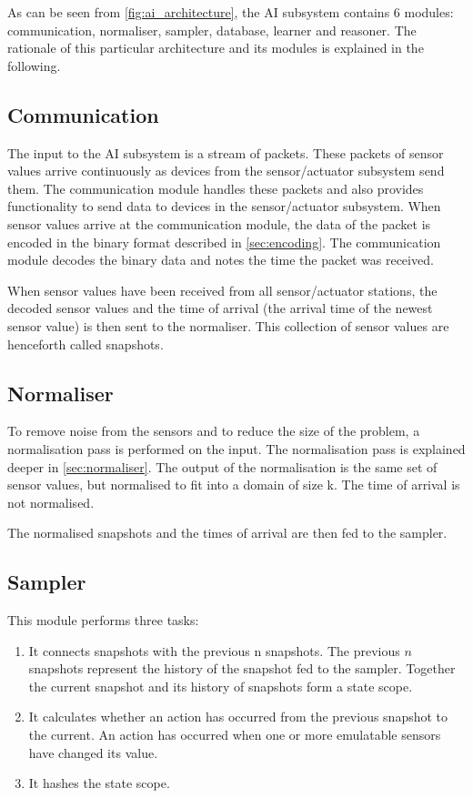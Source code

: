 As can be seen from \cref{fig:ai_architecture}, the AI subsystem contains 6 modules: communication, normaliser, sampler, database, learner and reasoner. The rationale of this particular architecture and its modules is explained in the following.

\subsection{Communication}
The input to the AI subsystem is a stream of packets. These packets of sensor values arrive continuously as devices from the sensor/actuator subsystem send them. The communication module handles these packets and also provides functionality to send data to devices in the sensor/actuator subsystem. When sensor values arrive at the communication module, the data of the packet is encoded in the binary format described in \cref{sec:encoding}. The communication module decodes the binary data and notes the time the packet was received.

When sensor values have been received from all sensor/actuator stations, the decoded sensor values and the time of arrival (the arrival time of the newest sensor value) is then sent to the normaliser. This collection of sensor values are henceforth called snapshots.

\subsection{Normaliser}
To remove noise from the sensors and to reduce the size of the problem, a normalisation pass is performed on the input. The normalisation pass is explained deeper in \cref{sec:normaliser}. The output of the normalisation is the same set of sensor values, but normalised to fit into a domain of size k. The time of arrival is not normalised.

The normalised snapshots and the times of arrival are then fed to the sampler.

\subsection{Sampler}
This module performs three tasks:

\begin{enumerate}
\item It connects snapshots with the previous n snapshots. The previous $n$ snapshots represent the history of the snapshot fed to the sampler. Together the current snapshot and its history of snapshots form a state scope.
\item It calculates whether an action has occurred from the previous snapshot to the current. An action has occurred when one or more emulatable sensors have changed its value.
\item It hashes the state scope.
\end{enumerate}

